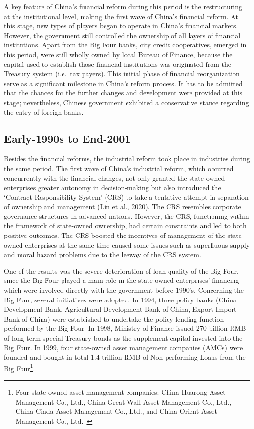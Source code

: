 \documentclass[
  letterpaper,
  DIV=11,
  numbers=noendperiod]{scrreprt}
\begin{document}
A key feature of China's financial reform during this period is the
restructuring at the institutional level, making the first wave of
China's financial reform. At this stage, new types of players began to
operate in China's financial markets. However, the government still
controlled the ownership of all layers of financial institutions. Apart
from the Big Four banks, city credit cooperatives, emerged in this
period, were still wholly owned by local Bureau of Finance, because the
capital used to establish those financial institutions was originated
from the Treasury system (i.e.~tax payers). This initial phase of
financial reorganization serve as a significant milestone in China's
reform process. It has to be admitted that the chances for the further
changes and development were provided at this stage; nevertheless,
Chinese government exhibited a conservative stance regarding the entry
of foreign banks.

\subsection{Early-1990s to End-2001}\label{early-1990s-to-end-2001}

Besides the financial reforms, the industrial reform took place in
industries during the same period. The first wave of China's industrial
reform, which occurred concurrently with the financial changes, not only
granted the state-owned enterprises greater autonomy in decision-making
but also introduced the `Contract Responsibility System' (CRS) to take a
tentative attempt in separation of ownership and management (Lin et al.,
2020). The CRS resembles corporate governance structures in advanced
nations. However, the CRS, functioning within the framework of
state-owned ownership, had certain constraints and led to both positive
outcomes. The CRS boosted the incentives of management of the
state-owned enterprises at the same time caused some issues such as
superfluous supply and moral hazard problems due to the leeway of the
CRS system.

One of the results was the severe deterioration of loan quality of the
Big Four, since the Big Four played a main role in the state-owned
enterprises' financing which were involved directly with the government
before 1990's. Concerning the Big Four, several initiatives were
adopted. In 1994, three policy banks (China Development Bank,
Agricultural Development Bank of China, Export-Import Bank of China)
were established to undertake the policy-lending function performed by
the Big Four. In 1998, Ministry of Finance issued 270 billion RMB of
long-term special Treasury bonds as the supplement capital invested into
the Big Four. In 1999, four state-owned asset management companies
(AMCs) were founded and bought in total 1.4 trillion RMB of
Non-performing Loans from the Big Four\footnote{Four state-owned asset
  management companies: China Huarong Asset Management Co., Ltd., China
  Great Wall Asset Management Co., Ltd., China Cinda Asset Management
  Co., Ltd., and China Orient Asset Management Co., Ltd.~}.
\end{document}
